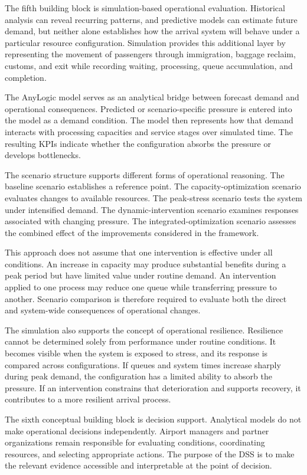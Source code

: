 The fifth building block is simulation-based operational evaluation. Historical analysis can reveal recurring patterns, and predictive models can estimate future demand, but neither alone establishes how the arrival system will behave under a particular resource configuration. Simulation provides this additional layer by representing the movement of passengers through immigration, baggage reclaim, customs, and exit while recording waiting, processing, queue accumulation, and completion.

The AnyLogic model serves as an analytical bridge between forecast demand and operational consequences. Predicted or scenario-specific pressure is entered into the model as a demand condition. The model then represents how that demand interacts with processing capacities and service stages over simulated time. The resulting KPIs indicate whether the configuration absorbs the pressure or develops bottlenecks.

The scenario structure supports different forms of operational reasoning. The baseline scenario establishes a reference point. The capacity-optimization scenario evaluates changes to available resources. The peak-stress scenario tests the system under intensified demand. The dynamic-intervention scenario examines responses associated with changing pressure. The integrated-optimization scenario assesses the combined effect of the improvements considered in the framework.

This approach does not assume that one intervention is effective under all conditions. An increase in capacity may produce substantial benefits during a peak period but have limited value under routine demand. An intervention applied to one process may reduce one queue while transferring pressure to another. Scenario comparison is therefore required to evaluate both the direct and system-wide consequences of operational changes.

The simulation also supports the concept of operational resilience. Resilience cannot be determined solely from performance under routine conditions. It becomes visible when the system is exposed to stress, and its response is compared across configurations. If queues and system times increase sharply during peak demand, the configuration has a limited ability to absorb the pressure. If an intervention constrains that deterioration and supports recovery, it contributes to a more resilient arrival process.

The sixth conceptual building block is decision support. Analytical models do not make operational decisions independently. Airport managers and partner organizations remain responsible for evaluating conditions, coordinating resources, and selecting appropriate actions. The purpose of the DSS is to make the relevant evidence accessible and interpretable at the point of decision.

